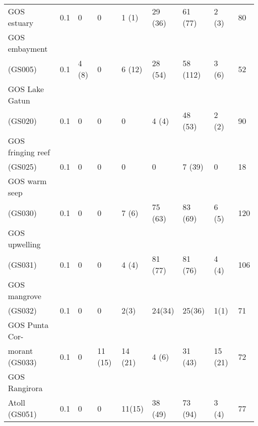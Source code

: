 \begin{longtable}{p{2.8cm}p{0.5cm}p{1.2cm}p{1cm}p{1cm}p{1.4cm}p{1.4cm}p{1.2cm}p{0.5cm}}
GOS estuary & 0.1 & 0 & 0 & 1 (1) & 29 (36) & 61 (77) & 2 (3) & 80 \\
GOS embayment \\(GS005) & 0.1 & 4 (8) & 0 & 6 (12) & 28 (54) & 58 (112) & 3 (6) & 52 \\
GOS Lake Gatun \\(GS020) & 0.1 & 0 & 0 & 0 & 4 (4) & 48 (53) & 2 (2) & 90 \\
GOS fringing reef \\(GS025) & 0.1 & 0 & 0 & 0 & 0 & 7 (39) & 0 & 18 \\
GOS warm seep \\(GS030) & 0.1 & 0 & 0 & 7 (6) & 75 (63) & 83 (69) & 6 (5) & 120 \\
GOS upwelling \\(GS031) & 0.1 & 0 & 0 & 4 (4) & 81 (77) & 81 (76) & 4 (4) & 106 \\
GOS mangrove \\(GS032) & 0.1 & 0 & 0 & 2(3) & 24(34) & 25(36) & 1(1) & 71 \\
GOS Punta Cor-\\morant (GS033) & 0.1 & 0 & 11 (15) & 14 (21) & 4 (6) & 31 (43) & 15 (21) & 72 \\
GOS Rangirora \\Atoll (GS051) & 0.1 & 0 & 0 & 11(15) & 38 (49) & 73 (94) & 3 (4) & 77 \\
\end{longtable}
\endgroup

